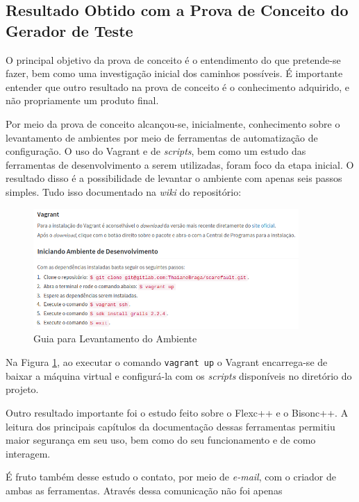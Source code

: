 \subsection{Resultado Obtido com a Prova de Conceito do Gerador de Teste}
O principal objetivo da prova de conceito é o entendimento do que pretende-se
fazer, bem como uma investigação inicial dos caminhos possíveis. É importante
entender que outro  resultado na prova de conceito é o conhecimento adquirido,
e não propriamente um produto final.
\par
\indent Por meio da prova de conceito alcançou-se, inicialmente, conhecimento
sobre o levantamento de ambientes por meio de ferramentas de automatização de
configuração. O uso do Vagrant e de \textit{scripts}, bem como um estudo das
ferramentas de desenvolvimento a serem utilizadas, foram foco da etapa inicial.
O resultado disso é a possibilidade de levantar o ambiente com apenas seis passos
simples. Tudo isso documentado na \textit{wiki}  do repositório:
\par
\begin{figure}[h]
    \centering
    \includegraphics[width=0.9\textwidth]{figuras/guide-vagrant.png}
    \caption{Guia para Levantamento do Ambiente}
    \label{fig:guide-vagrant}
 \end{figure}
\par
\indent Na Figura \ref{fig:guide-vagrant}, ao executar o comando \lstinline|vagrant up|
o Vagrant encarrega-se de baixar a máquina virtual e configurá-la com os
\textit{scripts} disponíveis no diretório do projeto.
\par
\indent Outro resultado importante foi o estudo feito sobre o Flexc++ e o Bisonc++.
A leitura dos principais capítulos da documentação dessas ferramentas permitiu
maior segurança em seu uso, bem como do seu funcionamento e de como interagem.
\par
\indent É fruto também desse estudo o contato, por meio de \textit{e-mail}, com
o criador de ambas as ferramentas. Através dessa comunicação não foi apenas
